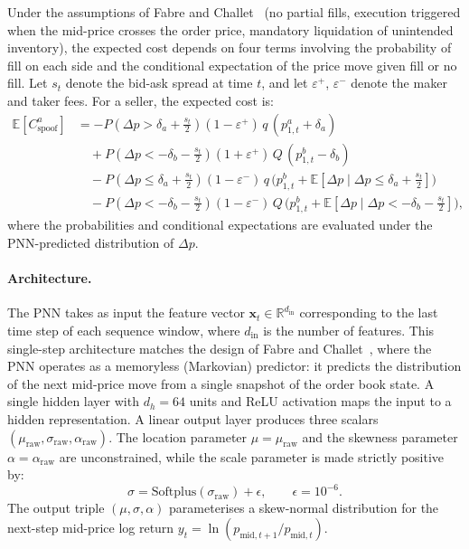 \documentclass[11pt]{report}
\begin{document}
Under the assumptions of Fabre and Challet~\cite{fabre_2025} (no partial fills, execution triggered when the mid-price crosses the order price, mandatory liquidation of unintended inventory), the expected cost depends on four terms involving the probability of fill on each side and the conditional expectation of the price move given fill or no fill. Let $s_t$ denote the bid-ask spread at time $t$, and let $\varepsilon^+$, $\varepsilon^-$ denote the maker and taker fees. For a seller, the expected cost is:
\begin{align}
  \label{eq:expected_cost}
  \mathbb{E}\!\left[C^a_{\text{spoof}}\right] &= -P\!\left(\Delta p > \delta_a + \tfrac{s_t}{2}\right)(1 - \varepsilon^+)\, q\,(p^a_{1,t} + \delta_a) \nonumber \\
  &\quad + P\!\left(\Delta p < -\delta_b - \tfrac{s_t}{2}\right)(1 + \varepsilon^+)\, Q\,(p^b_{1,t} - \delta_b) \nonumber \\
  &\quad - P\!\left(\Delta p \leq \delta_a + \tfrac{s_t}{2}\right)(1 - \varepsilon^-)\, q\,\bigl(p^b_{1,t} + \mathbb{E}[\Delta p \mid \Delta p \leq \delta_a + \tfrac{s_t}{2}]\bigr) \nonumber \\
  &\quad - P\!\left(\Delta p < -\delta_b - \tfrac{s_t}{2}\right)(1 - \varepsilon^-)\, Q\,\bigl(p^b_{1,t} + \mathbb{E}[\Delta p \mid \Delta p < -\delta_b - \tfrac{s_t}{2}]\bigr),
\end{align}
where the probabilities and conditional expectations are evaluated under the PNN-predicted distribution of $\Delta p$.

\paragraph{Architecture.}
The PNN takes as input the feature vector $\mathbf{x}_t \in \mathbb{R}^{d_{\text{in}}}$ corresponding to the last time step of each sequence window, where $d_{\text{in}}$ is the number of features. This single-step architecture matches the design of Fabre and Challet~\cite{fabre_2025}, where the PNN operates as a memoryless (Markovian) predictor: it predicts the distribution of the next mid-price move from a single snapshot of the order book state. A single hidden layer with $d_h = 64$ units and ReLU activation maps the input to a hidden representation. A linear output layer produces three scalars $(\mu_{\text{raw}}, \sigma_{\text{raw}}, \alpha_{\text{raw}})$. The location parameter $\mu = \mu_{\text{raw}}$ and the skewness parameter $\alpha = \alpha_{\text{raw}}$ are unconstrained, while the scale parameter is made strictly positive by:
\begin{equation}
  \label{eq:pnn_sigma}
  \sigma = \mathrm{Softplus}(\sigma_{\text{raw}}) + \epsilon, \qquad \epsilon = 10^{-6}.
\end{equation}
The output triple $(\mu, \sigma, \alpha)$ parameterises a skew-normal distribution for the next-step mid-price log return $y_t = \ln(p_{\text{mid},t+1} / p_{\text{mid},t})$.
\end{document}
